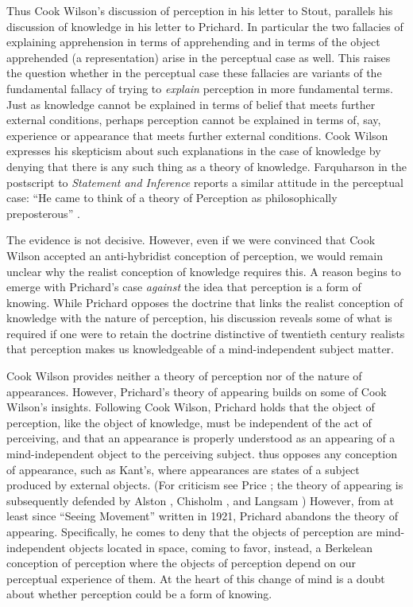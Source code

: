 \documentclass[11pt]{article}
\begin{document}
Thus Cook Wilson's discussion of perception in his letter to Stout, parallels his discussion of knowledge in his letter to Prichard. In particular the two fallacies of explaining apprehension in terms of apprehending and in terms of the object apprehended (a representation) arise in the perceptual case as well. This raises the question whether in the perceptual case these fallacies are variants of the fundamental fallacy of trying to \emph{explain} perception in more fundamental terms. Just as knowledge cannot be explained in terms of belief that meets further  external conditions, perhaps perception cannot be explained in terms of, say, experience or appearance that meets further external conditions. Cook Wilson expresses his skepticism about such explanations in the case of knowledge by denying that there is any such thing as a theory of knowledge. Farquharson in the postscript to \emph{Statement and Inference} reports a similar attitude in the perceptual case: ``He came to think of a theory of Perception as philosophically preposterous'' \citep[882]{Cook-Wilson:1926sf}. 

The evidence is not decisive. However, even if we were convinced that Cook Wilson accepted an anti-hybridist conception of perception, we would remain unclear why the realist conception of knowledge requires this. A reason begins to emerge with Prichard's case \emph{against} the idea that perception is a form of knowing. While Prichard opposes the doctrine that links the realist conception of knowledge with the nature of perception, his discussion reveals some of what is required if one were to retain the doctrine distinctive of twentieth century realists that perception makes us knowledgeable of a mind-independent subject matter.

Cook Wilson provides neither a theory of perception nor of the nature of appearances. However, Prichard's \citeyearpar{Prichard:1906gf,Prichard:1909yg} theory of appearing builds on some of Cook Wilson's insights. Following Cook Wilson, Prichard holds that the object of perception, like the object of knowledge, must be independent of the act of perceiving, and that an appearance is properly understood as an appearing of a mind-independent object to the perceiving subject. \citet{Prichard:1909yg} thus opposes any conception of appearance, such as Kant's, where appearances are states of a subject produced by external objects. (For criticism see Price \citeyear{Price:1932fk}; the theory of appearing is subsequently defended by Alston \citeyear{Alston:1993zl}, Chisholm \citeyear{Chisholm:1950rj}, and Langsam \citeyear{Langsam:1997md}) However, from at least since ``Seeing Movement'' written in 1921, Prichard abandons the theory of appearing. Specifically, he comes to deny that the objects of perception are mind-independent objects located in space, coming to favor, instead, a Berkelean conception of perception where the objects of perception depend on our perceptual experience of them. At the heart of this change of mind is a doubt about whether perception could be a form of knowing.
\end{document}
